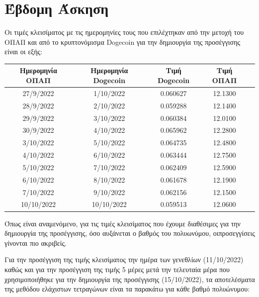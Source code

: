 \documentclass[a4paper,11pt]{article}
\newcommand{\lt}{\latintext}
\newcommand{\gt}{\greektext}
\begin{document}
\section{Έβδομη Άσκηση}

\gt
Οι τιμές κλεισίματος με τις ημερομηνίες τους που επιλέχτηκαν από την μετοχή του ΟΠΑΠ και από το κρυπτονόμισμα \lt Dogecoin \gt για την δημιουργία της προσέγγισης είναι οι εξής:
\begin{center}
\begin{tabular}{ |c|c|c|c|c| } 
 \hline
Ημερομηνία ΟΠΑΠ & Ημερομηνία \lt Dogecoin & Tιμή \lt Dogecoin & Τιμή \gt ΟΠΑΠ\\
\hline
27/9/2022 & 1/10/2022  & 0.060627 & 12.1300\\
28/9/2022 & 2/10/2022 & 0.059288 & 12.1400\\
29/9/2022 & 3/10/2022 & 0.060384 & 12.0100\\
30/9/2022 & 4/10/2022 & 0.065962 & 12.2800\\
3/10/2022 & 5/10/2022 & 0.064735 & 12.4800\\
4/10/2022 & 6/10/2022 & 0.063444 & 12.7500\\
5/10/2022 & 7/10/2022 & 0.062409 & 12.5900\\
6/10/2022 & 8/10/2022 & 0.061678 & 12.1900\\
7/10/2022 & 9/10/2022 & 0.062156 & 12.1500\\
10/10/2022 & 10/10/2022 & 0.059513 & 12.0600\\
 \hline
\end{tabular}
\end{center}
\newpage
Όπως είναι αναμενόμενο, για τις τιμές κλεισίματος που έχουμε διαθέσιμες για την δημιουργία της προσέγγισης, όσο αυξάνεται ο βαθμός του πολυωνύμου, οιπροσεγγίσεις γίνονται πιο ακριβείς. \par
Για την προσέγγιση της τιμής κλεισίματος την ημέρα των γενεθλίων (11/10/2022) καθώς και για την προσέγγιση της τιμής 5 μέρες μετά την τελευταία μέρα που χρησιμοποιήθηκε για την δημιουργία της προσέγγισης (15/10/2022), τα αποτελέσματα της μεθόδου ελάχιστων τετραγώνων είναι τα παρακάτω για κάθε βαθμό πολυώνυμου: \\
\end{document}
